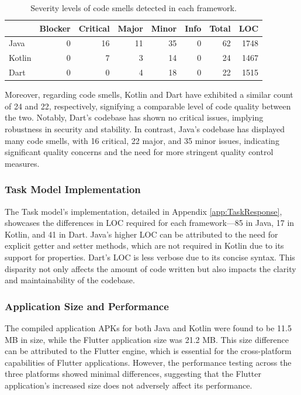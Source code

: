 \begin{table}[htbp]
	\begin{tabular}{l|r|r|r|r|r|r|r}
		\hline
        \cellcolor{Gray} & \cellcolor{Gray}Blocker & \cellcolor{Gray} Critical & \cellcolor{Gray} Major& \cellcolor{Gray}Minor& \cellcolor{Gray}Info & \cellcolor{Gray}Total& \cellcolor{Gray}LOC\\
        \hline
        \cellcolor{Gray} Java    & 0 & 16 & 11 & 35 & 0 & 62 & 1748 \\
        \cellcolor{Gray}Kotlin  & 0 & 7 & 3 & 14 & 0 & 24 & 1467 \\
        \cellcolor{Gray}Dart & 0 & 0 & 4 & 18 & 0 & 22 & 1515 \\
    
    \end{tabular}
	\caption{Severity levels of code smells detected in each framework. \label{tab:kanban}}
\end{table}
\par
Moreover, regarding code smells, Kotlin and Dart have exhibited a similar count of 24 and 22, respectively, signifying a comparable level of code quality between the two. Notably, Dart's codebase has shown no critical issues, implying robustness in security and stability. In contrast, Java's codebase has displayed many code smells, with 16 critical, 22 major, and 35 minor issues, indicating significant quality concerns and the need for more stringent quality control measures.
\subsubsection{Task Model Implementation}
The Task model's implementation, detailed in Appendix \ref*{app:TaskResponse}, showcases the differences in LOC required for each framework—85 in Java, 17 in Kotlin, and 41 in Dart. Java's higher LOC can be attributed to the need for explicit getter and setter methods, which are not required in Kotlin due to its support for properties. Dart's LOC is less verbose due to its concise syntax. This disparity not only affects the amount of code written but also impacts the clarity and maintainability of the codebase.
\subsubsection{Application Size and Performance}
The compiled application APKs for both Java and Kotlin were found to be 11.5 MB in size, while the Flutter application size was 21.2 MB. This size difference can be attributed to the Flutter engine, which is essential for the cross-platform capabilities of Flutter applications. However, the performance testing across the three platforms showed minimal differences, suggesting that the Flutter application's increased size does not adversely affect its performance.
